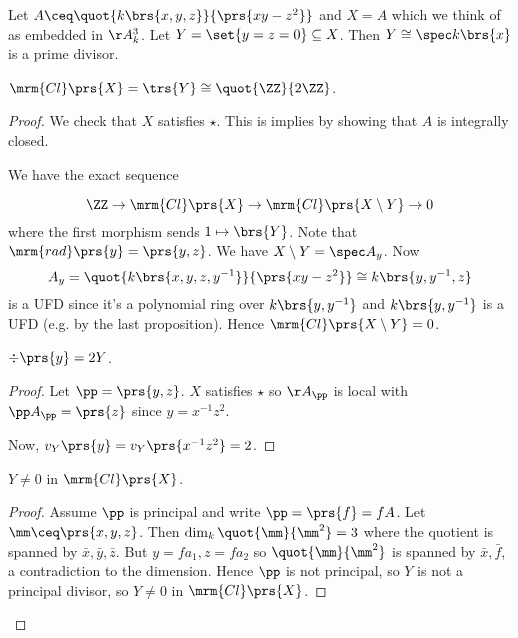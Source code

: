 \documentclass[10pt,a4paper,twoside,openany,hidelinks]{book}
\begin{document}
\begin{example}
Let $A \ceq \quot{k\brs{x,y,z}}{\prs{xy - z^2}}$ and $X = A$ which we think of as embedded in $\AA_k^3$.
Let $Y = \set{y = z = 0} \subseteq X$. Then $Y \cong \spec k\brs{x}$ is a prime divisor.
\end{example}

\begin{proposition}
$\mrm{Cl}\prs{X} = \trs{Y} \cong \quot{\ZZ}{2\ZZ}$.
\end{proposition}

\begin{proof}
We check that $X$ satisfies $\star$. This is implies by showing that $A$ is integrally closed.

We have the exact sequence

\[\ZZ \to \mrm{Cl}\prs{X} \to \mrm{Cl}\prs{X \setminus Y} \to 0\]
where the first morphism sends $1 \mapsto \brs{Y}$. Note that $\mrm{rad}\prs{y} = \prs{y,z}$.
We have $X \setminus Y = \spec A_y$. Now \[A_y = \quot{k\brs{x,y,z,y^{-1}}}{\prs{xy - z^2}} \cong k\brs{y, y^{-1}, z}\]
is a UFD since it's a polynomial ring over $k\brs{y,y^{-1}}$ and $k\brs{y,y^{-1}}$ is a UFD (e.g. by the last proposition).
Hence $\mrm{Cl}\prs{X \setminus Y} = 0$.

\begin{claim}
$\div\prs{y} = 2Y$.
\end{claim}

\begin{proof}
Let $\pp = \prs{y,z}$. $X$ satisfies $\star$ so $\AA_\pp$ is local with $\pp A_\pp = \prs{z}$ since $y = x^{-1} z^2$.

Now, $v_Y\prs{y} = v_Y\prs{x^{-1} z^2} = 2$.
\end{proof}

\begin{claim}
$Y \neq 0$ in $\mrm{Cl}\prs{X}$.
\end{claim}

\begin{proof}
Assume $\pp$ is principal and write $\pp = \prs{f} = fA$.
Let $\mm \ceq \prs{x,y,z}$. Then $\dim_k \quot{\mm}{\mm^2} = 3$ where the quotient is spanned by $\bar{x}, \bar{y}, \bar{z}$. But $y = f a_1, z = f a_2$ so $\quot{\mm}{\mm^2}$ is spanned by $\bar{x}, \bar{f}$, a contradiction to the dimension. Hence $\pp$ is not principal, so $Y$ is not a principal divisor, so $Y \neq 0$ in $\mrm{Cl}\prs{X}$.
\end{proof}

\end{proof}
\end{document}
